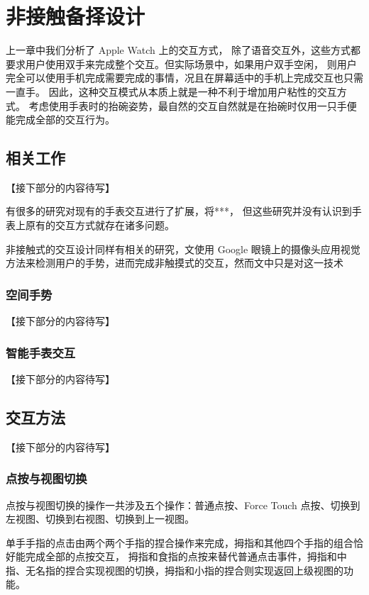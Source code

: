 \chapter{非接触备择设计}

\quad\quad 上一章中我们分析了 Apple Watch 上的交互方式，
除了语音交互外，这些方式都要求用户使用双手来完成整个交互。但实际场景中，如果用户双手空闲，
则用户完全可以使用手机完成需要完成的事情，况且在屏幕适中的手机上完成交互也只需一直手。
因此，这种交互模式从本质上就是一种不利于增加用户粘性的交互方式。
考虑使用手表时的抬碗姿势，最自然的交互自然就是在抬碗时仅用一只手便能完成全部的交互行为。

\section{相关工作}

【接下部分的内容待写】

有很多的研究对现有的手表交互进行了扩展，将***，
但这些研究并没有认识到手表上原有的交互方式就存在诸多问题。

非接触式的交互设计同样有相关的研究，文\cite{lv2015extending}使用 Google 眼镜上的摄像头应用视觉方法来检测用户的手势，进而完成非触摸式的交互，然而文中只是对这一技术

\subsection{空间手势}

【接下部分的内容待写】

\subsection{智能手表交互}

【接下部分的内容待写】

\section{交互方法}

【接下部分的内容待写】

\subsection{点按与视图切换}

点按与视图切换的操作一共涉及五个操作：普通点按、Force Touch 点按、切换到左视图、切换到右视图、切换到上一视图。

单手手指的点击由两个两个手指的捏合操作来完成，拇指和其他四个手指的组合恰好能完成全部的点按交互，
拇指和食指的点按来替代普通点击事件，拇指和中指、无名指的捏合实现视图的切换，拇指和小指的捏合则实现返回上级视图的功能。

